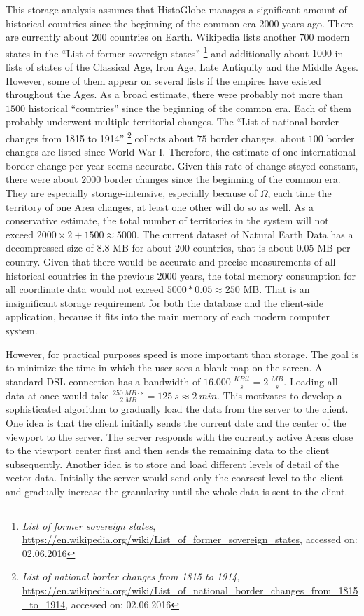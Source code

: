This storage analysis assumes that HistoGlobe manages a significant amount of historical countries since the beginning of the common era 2000 years ago. There are currently about $200$ countries on Earth. Wikipedia lists another $700$ modern states in the ``List of former sovereign states''
\footnote{
  \emph{List of former sovereign states},
  \url{https://en.wikipedia.org/wiki/List_of_former_sovereign_states},
  accessed on: 02.06.2016
}
and additionally about $1000$ in lists of states of the Classical Age, Iron Age, Late Antiquity and the Middle Ages. However, some of them appear on several lists if the empires have existed throughout the Ages. As a broad estimate, there were probably not more than $1500$ historical ``countries'' since the beginning of the common era. Each of them probably underwent multiple territorial changes. The ``List of national border changes from 1815 to 1914''
\footnote{
  \emph{List of national border changes from 1815 to 1914},
  \url{https://en.wikipedia.org/wiki/List_of_national_border_changes_from_1815_to_1914},
  accessed on: 02.06.2016
}
collects about $75$ border changes, about $100$ border changes are listed since World War I. Therefore, the estimate of one international border change per year seems accurate. Given this rate of change stayed constant, there were about $2000$ border changes since the beginning of the common era. They are especially storage-intensive, especially because of $\Omega$, each time the territory of one Area changes, at least one other will do so as well. As a conservative estimate, the total number of territories in the system will not exceed $2000 \times 2 + 1500 \approx 5000$. The current dataset of Natural Earth Data has a decompressed size of $8.8$ MB for about $200$ countries, that is about $0.05$ MB per country. Given that there would be accurate and precise measurements of all historical countries in the previous 2000 years, the total memory consumption for all coordinate data would not exceed $5000 * 0.05 \approx 250$ MB. That is an insignificant storage requirement for both the database and the client-side application, because it fits into the main memory of each modern computer system.

However, for practical purposes speed is more important than storage.
The goal is to minimize the time in which the user sees a blank map on the screen.
A standard DSL connection has a bandwidth of $16.000 ~\frac{KBit}{s} = 2 ~\frac{MB}{s}$. Loading all data at once would take $\frac{250 ~MB \cdot s}{2 ~MB} = 125 ~s \approx 2 ~min $. This motivates to develop a sophisticated algorithm to gradually load the data from the server to the client.
One idea is that the client initially sends the current date and the center of the viewport to the server. The server responds with the currently active Areas close to the viewport center first and then sends the remaining data to the client subsequently.
Another idea is to store and load different levels of detail of the vector data. Initially the server would send only the coarsest level to the client and gradually increase the granularity until the whole data is sent to the client.


